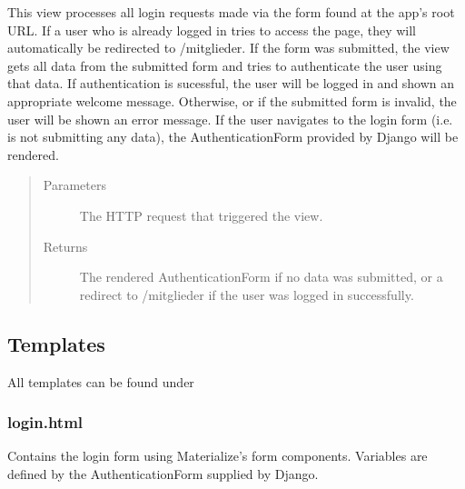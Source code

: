 \documentclass[letterpaper,10pt,english]{sphinxmanual}
\begin{document}

\begin{fulllineitems}
\label{\detokenize{masterCodeDoc:login.views.main_screen}}
This view processes all login requests made via the form found at the app’s root URL.
If a user who is already logged in tries to access the page, they will automatically be redirected to /mitglieder.
If the form was submitted, the view gets all data from the submitted form and tries to authenticate the user using that data. 
If authentication is sucessful, the user will be logged in and shown an appropriate welcome message. Otherwise, or if the submitted form is invalid, the user will be shown an error message.
If the user navigates to the login form (i.e. is not submitting any data), the AuthenticationForm provided by Django will be rendered.
\begin{quote}\begin{description}
\item[{Parameters}] \leavevmode
{} \textendash{} The HTTP request that triggered the view.

\item[{Returns}] \leavevmode
The rendered AuthenticationForm if no data was submitted, or a redirect to /mitglieder if the user was logged in successfully.

\end{description}\end{quote}

\end{fulllineitems}



\subsection{Templates}
\label{\detokenize{masterCodeDoc:templates}}
All templates can be found under 


\subsubsection{login.html}
\label{\detokenize{masterCodeDoc:login-html}}
Contains the login form using Materialize’s form components. Variables are defined by the AuthenticationForm supplied by Django.
\end{document}
